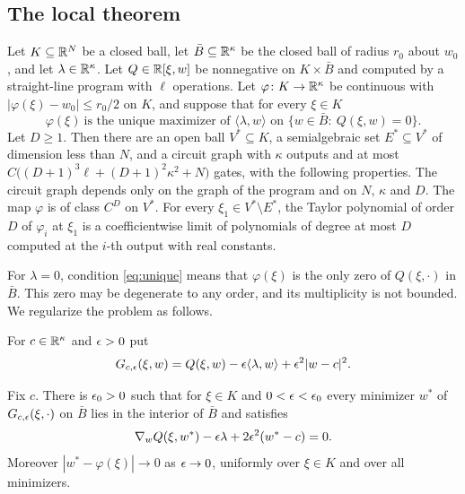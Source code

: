 \subsection{The local theorem}

\begin{theorem}\label{thm:local}
Let $K\subseteq\mathbb{R}^N$ be a closed ball, let $\bar B\subseteq\mathbb{R}^\kappa$ be the closed ball of radius $r_0$ about $w_0$, and let $\lambda\in\mathbb{R}^\kappa$. Let $Q\in\mathbb{R}[\xi,w]$ be nonnegative on $K\times\bar B$ and computed by a straight-line program with $\ell$ operations. Let $\varphi\colon K\to\mathbb{R}^\kappa$ be continuous with $|\varphi(\xi)-w_0|\le r_0/2$ on $K$, and suppose that for every $\xi\in K$
\begin{equation}\label{eq:unique}
\varphi(\xi)\ \text{is the unique maximizer of }\langle\lambda,w\rangle\text{ on }\{w\in\bar B:\ Q(\xi,w)=0\}.
\end{equation}
Let $D\ge1$. Then there are an open ball $V^*\subseteq K$, a semialgebraic set $E^*\subseteq V^*$ of dimension less than $N$, and a circuit graph with $\kappa$ outputs and at most $C\bigl((D+1)^3\ell+(D+1)^2\kappa^2+N\bigr)$ gates, with the following properties. The circuit graph depends only on the graph of the program and on $N$, $\kappa$ and $D$. The map $\varphi$ is of class $C^D$ on $V^*$. For every $\xi_1\in V^*\setminus E^*$, the Taylor polynomial of order $D$ of $\varphi_i$ at $\xi_1$ is a coefficientwise limit of polynomials of degree at most $D$ computed at the $i$-th output with real constants.
\end{theorem}

For $\lambda=0$, condition \eqref{eq:unique} means that $\varphi(\xi)$ is the only zero of $Q(\xi,\cdot)$ in $\bar B$. This zero may be degenerate to any order, and its multiplicity is not bounded. We regularize the problem as follows.

For $c\in\mathbb{R}^\kappa$ and $\epsilon>0$ put
\[
G_{c,\epsilon}(\xi,w)=Q(\xi,w)-\epsilon\langle\lambda,w\rangle+\epsilon^2|w-c|^2 .
\]

\begin{lemma}\label{lem:minimisers}
Fix $c$. There is $\epsilon_0>0$ such that for $\xi\in K$ and $0<\epsilon<\epsilon_0$ every minimizer $w^*$ of $G_{c,\epsilon}(\xi,\cdot)$ on $\bar B$ lies in the interior of $\bar B$ and satisfies
\begin{equation}\label{eq:critical}
\nabla_wQ(\xi,w^*)-\epsilon\lambda+2\epsilon^2(w^*-c)=0 .
\end{equation}
Moreover $|w^*-\varphi(\xi)|\to0$ as $\epsilon\to0$, uniformly over $\xi\in K$ and over all minimizers.
\end{lemma}

